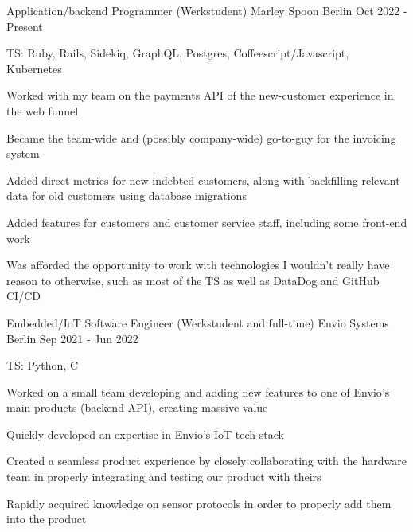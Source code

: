 \documentclass[11pt, a4paper]{awesome-cv}
\begin{document}
\begin{cventries}

  \cventry
    {Application/backend Programmer (Werkstudent)} %
    {Marley Spoon} %
    {Berlin} %
    {Oct 2022 - Present} %
    {
      \begin{cvitems} %
        \item {TS: Ruby, Rails, Sidekiq, GraphQL, Postgres, Coffeescript/Javascript, Kubernetes}
        \item {Worked with my team on the payments API of the new-customer experience in the web funnel}
        \item {Became the team-wide and (possibly company-wide) go-to-guy for the invoicing system}
        \item {Added direct metrics for new indebted customers, along with backfilling relevant data for old customers using database migrations}
        \item {Added features for customers and customer service staff, including some front-end work}
        \item {Was afforded the opportunity to work with technologies I wouldn't really have reason to otherwise, such as most of the TS as well as DataDog and GitHub CI/CD}
      \end{cvitems}
    }

  \cventry
    {Embedded/IoT Software Engineer (Werkstudent and full-time)} %
    {Envio Systems} %
    {Berlin} %
    {Sep 2021 - Jun 2022} %
    {
      \begin{cvitems} %
        \item {TS: Python, C}
        \item {Worked on a small team developing and adding new features to one of Envio's main products (backend API), creating massive value}
        \item {Quickly developed an expertise in Envio's IoT tech stack}
        \item {Created a seamless product experience by closely collaborating with the hardware team in properly integrating and testing our product with theirs}
        \item {Rapidly acquired knowledge on sensor protocols in order to properly add them into the product}
      \end{cvitems}
    }


\end{cventries}
\end{document}

